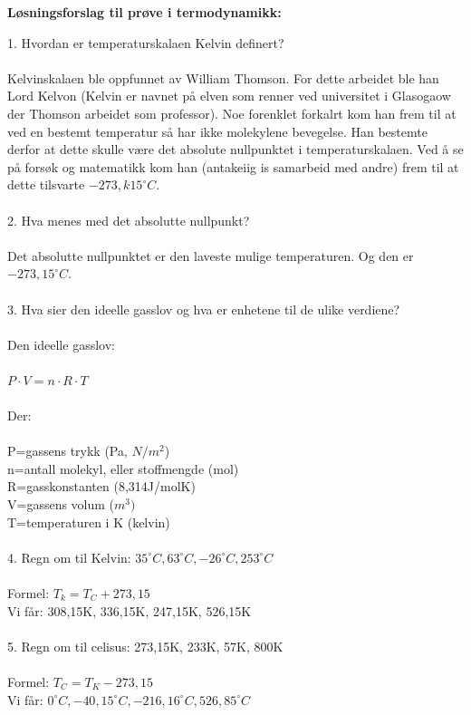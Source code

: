 \documentclass[12pt,a4paper]{article}
\begin{document}
\begin{center}
    \large\textbf{Løsningsforslag til prøve i termodynamikk:}
\end{center}
1.  Hvordan er temperaturskalaen Kelvin definert?\\\\
Kelvinskalaen ble oppfunnet av William Thomson.  For dette arbeidet ble han Lord Kelvon (Kelvin er navnet på elven som renner ved universitet i Glasogaow der Thomson arbeidet som professor).   Noe forenklet forkalrt kom han frem til at ved en bestemt temperatur så har ikke molekylene bevegelse.  Han bestemte derfor at dette skulle være det absolute nullpunktet i temperaturskalaen. Ved å se på forsøk og matematikk kom han (antakeiig  is samarbeid med andre) frem til at dette tilsvarte $-273,k15^\circ C$. \\\\
2.  Hva menes med det absolutte nullpunkt?\\\\
Det absolutte nullpunktet er den laveste mulige temperaturen. Og den er $-273,15^\circ C$.\\\\
3. Hva sier den ideelle gasslov og hva er enhetene til de ulike verdiene?\\\\
Den ideelle gasslov:\\\\
$P\cdot V=n\cdot R\cdot T$\\\\
Der:\\\\
P=gassens trykk (Pa, $N/m^2$)\\
n=antall molekyl, eller stoffmengde (mol)\\
R=gasskonstanten (8,314J/molK)\\
V=gassens volum ($m^3)$\\
T=temperaturen i K (kelvin)\\\\
4.  Regn om til Kelvin:  $35 ^\circ C, 63^\circ C, -26^\circ C, 253^\circ C $\\\\
Formel: $T_k=T_C+273,15$\\
Vi får: 308,15K, 336,15K, 247,15K, 526,15K\\\\
5. Regn om til celisus: 273,15K, 233K, 57K, 800K\\\\
Formel: $T_C=T_K-273,15$\\
Vi får: $0^\circ C, -40,15^\circ C, -216,16^\circ C, 526,85^\circ C$\newpage
\end{document}
